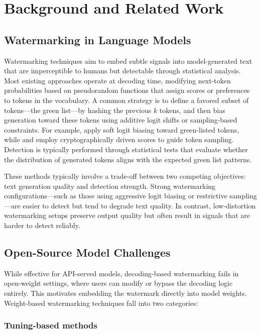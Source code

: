 \section{Background and Related Work}
\label{sec:background_related}

\subsection{Watermarking in Language Models}

Watermarking techniques aim to embed subtle signals into model-generated text that are imperceptible to humans but detectable through statistical analysis. Most existing approaches operate at decoding time, modifying next-token probabilities based on pseudorandom functions that assign scores or preferences to tokens in the vocabulary. A common strategy is to define a favored subset of tokens—the green list—by hashing the previous \(k\) tokens, and then bias generation toward these tokens using additive logit shifts or sampling-based constraints. For example, \citet{kirchenbauer2023watermark} apply soft logit biasing toward green-listed tokens, while \citet{aaronson2023reform} and \citet{kuditipudi2023robust} employ cryptographically driven scores to guide token sampling. Detection is typically performed through statistical tests that evaluate whether the distribution of generated tokens aligns with the expected green list patterns.

These methods typically involve a trade-off between two competing objectives: text generation quality and detection strength. Strong watermarking configurations—such as those using aggressive logit biasing or restrictive sampling—are easier to detect but tend to degrade text quality. In contrast, low-distortion watermarking setups preserve output quality but often result in signals that are harder to detect reliably.

\subsection{Open-Source Model Challenges}

While effective for API-served models, decoding-based watermarking fails in open-weight settings, where users can modify or bypass the decoding logic entirely. This motivates embedding the watermark directly into model weights. Weight-based watermarking techniques fall into two categories:

\subsubsection{Tuning-based methods}

